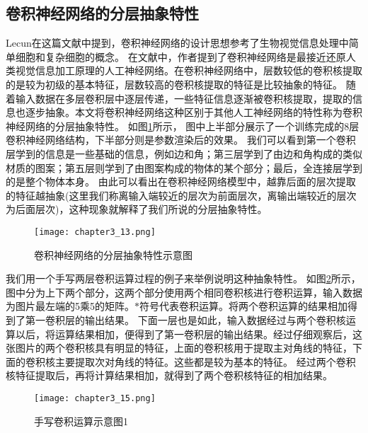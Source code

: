 \subsection{卷积神经网络的分层抽象特性}
Lecun在这篇文献\cite{726791}中提到，卷积神经网络的设计思想参考了生物视觉信息处理中简单细胞和复杂细胞\cite{hubel1962}的概念。
在文献\cite{2019arXiv190906161K}中，作者提到了卷积神经网络是最接近还原人类视觉信息加工原理的人工神经网络。在卷积神经网络中，层数较低的卷积核提取的是较为初级的基本特征，层数较高的卷积核提取的特征是比较抽象的特征。
随着输入数据在多层卷积层中逐层传递，一些特征信息逐渐被卷积核提取，提取的信息也逐步抽象。本文将卷积神经网络这种区别于其他人工神经网络的特性称为卷积神经网络的分层抽象特性。
如图\ref{fig:chapter3_13}所示， 图中上半部分展示了一个训练完成的8层卷积神经网络结构，下半部分则是参数渲染后的效果。
我们可以看到第一个卷积层学到的信息是一些基础的信息，例如边和角；第三层学到了由边和角构成的类似材质的图案；第五层则学到了由图案构成的物体的某个部分；最后，全连接层学到的是整个物体本身。
由此可以看出在卷积神经网络模型中，越靠后面的层次提取的特征越抽象(这里我们称离输入端较近的层次为前面层次，离输出端较近的层次为后面层次)，这种现象就解释了我们所说的分层抽象特性。
\begin{figure}
    \centering
    \texttt{[image: chapter3\_13.png]}
    \caption{卷积神经网络的分层抽象特性示意图\cite{luyujie2018}}
    \label{fig:chapter3_13}
\end{figure}


我们用一个手写两层卷积运算过程的例子来举例说明这种抽象特性。
如图\ref{fig:chapter3_15}所示，图中分为上下两个部分，这两个部分使用两个相同卷积核进行卷积运算，输入数据为图片最左端的5乘5的矩阵。$\ast$符号代表卷积运算。将两个卷积运算的结果相加得到了第一卷积层的输出结果。
下面一层也是如此，输入数据经过与两个卷积核运算以后，将运算结果相加，便得到了第一卷积层的输出结果。经过仔细观察后，这张图片的两个卷积核具有明显的特征，上面的卷积核用于提取主对角线的特征，下面的卷积核主要提取次对角线的特征。这些都是较为基本的特征。
经过两个卷积核特征提取后，再将计算结果相加，就得到了两个卷积核特征的相加结果。
\begin{figure}
    \centering
    \texttt{[image: chapter3\_15.png]}
    \caption{手写卷积运算示意图1}
    \label{fig:chapter3_15}
\end{figure}

